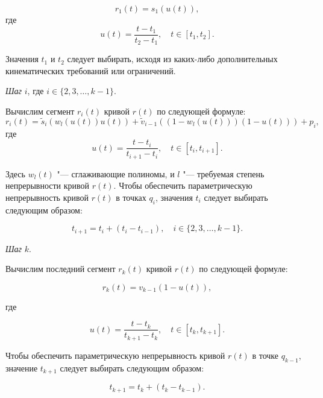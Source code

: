 $$
r_1(t)=s_1(u(t)),
$$
\noindent где
$$
u(t)=\frac{t-t_1}{t_2-t_1}, \quad t \in [t_1,t_2].
$$

Значения $t_1$ и $t_2$ следует выбирать, исходя из каких-либо дополнительных кинематических требований или ограничений.

\bigskip
\textit{Шаг} $i$, где $i \in \{2,3,\dots,k-1\}$.

Вычислим сегмент $r_i(t)$ кривой $r(t)$ по следующей формуле:
$$
r_i(t)=\tilde s_i(w_l(u(t))u(t))+\tilde v_{i-1}((1-w_l(u(t)))(1-u(t)))+p_i,
$$
\noindent где
$$
u(t)=\frac{t-t_i}{t_{i+1}-t_i}, \quad t \in [t_i,t_{i+1}].
$$

Здесь $w_l(t)$ "--- сглаживающие полиномы, и $l$ "--- требуемая степень непрерывности кривой $r(t)$. Чтобы обеспечить
параметрическую непрерывность кривой $r(t)$ в точках $q_i$, значения $t_i$ следует выбирать следующим образом:

$$
t_{i+1}=t_i+(t_i-t_{i-1}), \quad i \in \{2,3,\dots,k-1\}.
$$

\bigskip
\textit{Шаг} $k$.

Вычислим последний сегмент $r_k(t)$ кривой $r(t)$ по следующей формуле:

$$
r_k(t)=v_{k-1}(1-u(t)),
$$

\noindent где

$$
u(t)=\frac{t-t_k}{t_{k+1}-t_k}, \quad t \in [t_k,t_{k+1}].
$$

Чтобы обеспечить параметрическую непрерывность кривой $r(t)$ в точке $q_{k-1}$, значение $t_{k+1}$ следует выбирать
следующим образом:

$$
t_{k+1}=t_k+(t_k-t_{k-1}).
$$
